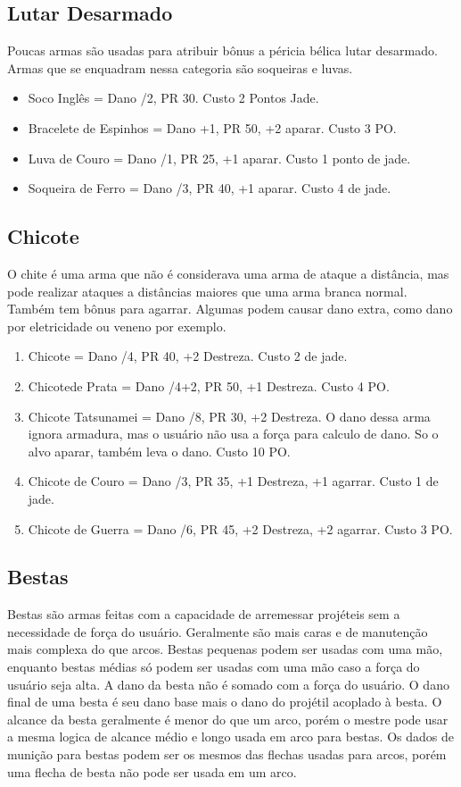\subsection{Lutar Desarmado}
Poucas armas são usadas para atribuir bônus a péricia bélica lutar desarmado. Armas que se enquadram nessa categoria são soqueiras e luvas.


\begin{itemize}	
	\item Soco Inglês = Dano /2, PR 30. Custo 2 Pontos Jade.
	\item Bracelete de Espinhos = Dano +1, PR 50, +2 aparar. Custo 3 PO.	
	\item Luva de Couro = Dano /1, PR 25, +1 aparar. Custo 1 ponto de jade.
	\item Soqueira de Ferro = Dano /3, PR 40, +1 aparar. Custo 4 de jade.
\end{itemize}	


\subsection{Chicote}
O chite é uma arma que não é considerava uma arma de ataque a distância, mas pode realizar ataques a distâncias maiores que uma arma branca normal. Também tem bônus para agarrar. Algumas podem causar dano extra, como dano por eletricidade ou veneno por exemplo.

\begin{enumerate}

\item Chicote = Dano /4, PR 40, +2 Destreza. Custo 2 de jade.
\item Chicotede Prata = Dano /4+2, PR 50, +1 Destreza. Custo 4 PO.
\item Chicote Tatsunamei = Dano /8, PR 30, +2 Destreza. O dano dessa arma ignora armadura, mas o usuário não usa a força para calculo de dano. So o alvo aparar, também leva o dano. Custo 10 PO.
\item Chicote de Couro = Dano /3, PR 35, +1 Destreza, +1 agarrar. Custo 1 de jade.
\item Chicote de Guerra = Dano /6, PR 45, +2 Destreza, +2 agarrar. Custo 3 PO.

  
\end{enumerate}


\subsection{Bestas}
Bestas são armas feitas com a capacidade de arremessar projéteis sem a necessidade de força do usuário. Geralmente são mais caras e de manutenção mais complexa do que arcos. Bestas pequenas podem ser usadas com uma mão, enquanto bestas médias só podem ser usadas com uma mão caso a força do usuário seja alta. A dano da besta não é somado com a força do usuário. O dano final de uma besta é seu dano base mais o dano do projétil acoplado à besta. O alcance da besta geralmente é menor do que um arco, porém o mestre pode usar a mesma logica de alcance médio e longo usada em arco para bestas. Os dados de munição para bestas podem ser os mesmos das flechas usadas para arcos, porém uma flecha de besta não pode ser usada em um arco. 

